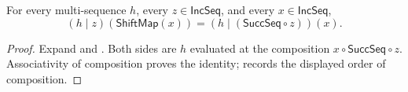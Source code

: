 \begin{lemma}
For every multi-sequence $h$, every $z\in\mathsf{IncSeq}$, and every
$x\in\mathsf{IncSeq}$,
\[
(h\mathbin{|}z)(\mathsf{ShiftMap}(x))
=
(h\mathbin{|}(\mathsf{SuccSeq}\circ z))(x).
\]
\end{lemma}
\begin{proof}
Expand  and .  Both sides
are $h$ evaluated at the composition
$x\circ\mathsf{SuccSeq}\circ z$.  Associativity of composition proves the
identity;  records the displayed order of composition.
\end{proof}
